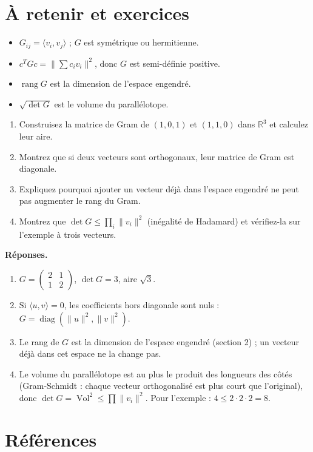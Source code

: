 \section*{À retenir et exercices}
\begin{itemize}
 \item $G_{ij}=\langle v_i,v_j\rangle$ ; $G$ est symétrique ou hermitienne.
 \item $c^TGc=\|\sum c_iv_i\|^2$, donc $G$ est semi-définie positive.
 \item $\operatorname{rang}G$ est la dimension de l'espace engendré.
 \item $\sqrt{\det G}$ est le volume du parallélotope.
\end{itemize}
\begin{enumerate}
 \item Construisez la matrice de Gram de $(1,0,1)$ et $(1,1,0)$ dans $\mathbb R^3$ et calculez leur aire.
 \item Montrez que si deux vecteurs sont orthogonaux, leur matrice de Gram est diagonale.
 \item Expliquez pourquoi ajouter un vecteur déjà dans l'espace engendré ne peut pas augmenter le rang du Gram.
 \item Montrez que $\det G\leq\prod_i\|v_i\|^2$ (inégalité de Hadamard) et vérifiez-la sur l'exemple à trois vecteurs.
\end{enumerate}
\textbf{Réponses.}
\begin{enumerate}
 \item $G=\begin{pmatrix}2&1\\1&2\end{pmatrix}$, $\det G=3$, aire $\sqrt3$.
 \item Si $\langle u,v\rangle=0$, les coefficients hors diagonale sont nuls : $G=\operatorname{diag}(\|u\|^2,\|v\|^2)$.
 \item Le rang de $G$ est la dimension de l'espace engendré (section 2) ; un vecteur déjà dans cet espace ne la change pas.
 \item Le volume du parallélotope est au plus le produit des longueurs des côtés (Gram-Schmidt : chaque vecteur orthogonalisé est plus court que l'original), donc $\det G=\operatorname{Vol}^2\leq\prod\|v_i\|^2$. Pour l'exemple : $4\leq2\cdot2\cdot2=8$.
\end{enumerate}

\section*{Références}
\begin{enumerate}
\end{enumerate}

